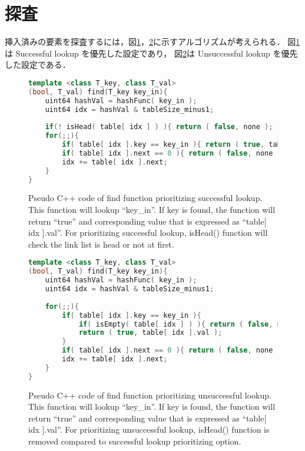 \section{探査}
挿入済みの要素を探査するには，図\ref{alg_find_sm}，\ref{alg_find_usm}に示すアルゴリズムが考えられる．
図\ref{alg_find_sm}は Successful lookup を優先した設定であり，
図\ref{alg_find_usm}は Unsuccessful lookup を優先した設定である．

\begin{figure} %
\begin{lstlisting}[language=C++]
template <class T_key, class T_val>
(bool, T_val) find(T_key key_in){
	uint64 hashVal = hashFunc( key_in );
	uint64 idx = hashVal & tableSize_minus1;
	
	if(! isHead( table[ idx ] ) ){ return ( false, none ); }
	for(;;){
		if( table[ idx ].key == key_in ){ return ( true, table[ idx ].val ); }
		if( table[ idx ].next == 0 ){ return ( false, none ); }
		idx += table[ idx ].next;
	}
}
\end{lstlisting}
\caption{
  Pseudo C++ code of find function prioritizing successful lookup.
  This function will lookup ``key\_in''.
  If key is found, the function will return ``true'' and corresponding value that is expressed as ``table[ idx ].val''.
  For prioritizing successful lookup, isHead() function will check the link list is head or not at first.
}
\label{alg_find_sm}
\end{figure}


\begin{figure} %
\begin{lstlisting}[language=C++]
template <class T_key, class T_val>
(bool, T_val) find(T_key key_in){
	uint64 hashVal = hashFunc( key_in );
	uint64 idx = hashVal & tableSize_minus1;
	
	for(;;){
		if( table[ idx ].key == key_in ){
			if( isEmpty( table[ idx ] ) ){ return ( false, none ); }
			return ( true, table[ idx ].val );
		}
		if( table[ idx ].next == 0 ){ return ( false, none ); }
		idx += table[ idx ].next;
	}
}
\end{lstlisting}
\caption{
  Pseudo C++ code of find function prioritizing unsuccessful lookup.
  This function will lookup ``key\_in''.
  If key is found, the function will return ``true'' and corresponding value that is expressed as ``table[ idx ].val''.
  For prioritizing unsuccessful lookup, isHead() function is removed compared to successful lookup prioritizing option.
}
\label{alg_find_usm}
\end{figure}

